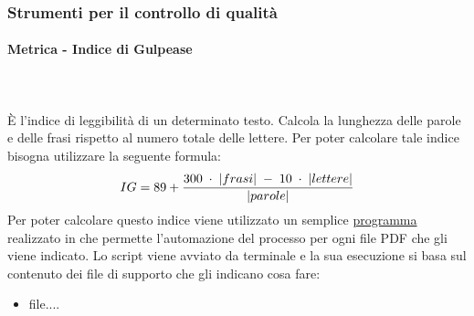 \subsubsection{Strumenti per il controllo di qualità}
\paragraph{Metrica - Indice di Gulpease}\mbox{}\\ \\
È l'indice di leggibilità di un determinato testo. Calcola la lunghezza delle parole e delle frasi rispetto al numero totale delle lettere. Per poter calcolare tale indice bisogna utilizzare la seguente formula:
$$IG = 89 + {{300 \; \cdot \; |frasi| \; - \; 10 \; \cdot \; |lettere|}\over |parole|}$$
Per poter calcolare questo indice viene utilizzato un semplice \href{...}{programma} realizzato in  che permette l'automazione del processo per ogni file PDF che gli viene indicato.
Lo script viene avviato da terminale e la sua esecuzione si basa sul contenuto dei file di supporto che gli indicano cosa fare: 
\begin{itemize}
    \item file....
\end{itemize}